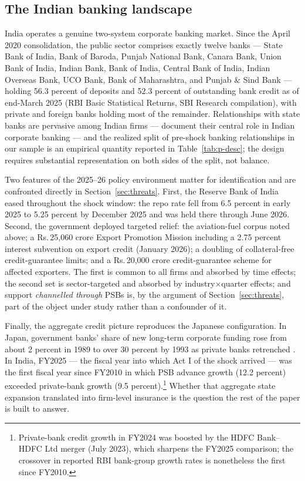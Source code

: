 \documentclass[12pt]{article}
\newcommand{\rupee}{Rs.\,}
\begin{document}
\subsection{The Indian banking landscape}\label{sec:banking}

India operates a genuine two-system corporate banking market. Since the April 2020
consolidation, the public sector comprises exactly twelve banks --- State Bank of India,
Bank of Baroda, Punjab National Bank, Canara Bank, Union Bank of India, Indian Bank, Bank
of India, Central Bank of India, Indian Overseas Bank, UCO Bank, Bank of Maharashtra, and
Punjab \& Sind Bank --- holding 56.3 percent of deposits and 52.3 percent of outstanding
bank credit as of end-March 2025 (RBI Basic Statistical Returns, SBI Research compilation),
with private and foreign banks holding most of the remainder. Relationships with state banks are
pervasive among Indian firms --- \citet{srinivasan2017} document their central role in
Indian corporate banking --- and the realized split of pre-shock banking relationships in
our sample is an empirical quantity reported in Table~\ref{tab:p-desc}; the design requires
substantial representation on both sides of the split, not balance.

Two features of the 2025--26 policy environment matter for identification and are
confronted directly in Section~\ref{sec:threats}. First, the Reserve Bank of India eased
throughout the shock window: the repo rate fell from 6.5 percent in early 2025 to 5.25
percent by December 2025 and was held there through June 2026. Second, the government
deployed targeted relief: the aviation-fuel corpus noted above; a \rupee 25{,}060 crore
Export Promotion Mission including a 2.75 percent interest subvention on export credit
(January 2026); a doubling of collateral-free credit-guarantee limits; and a
\rupee 20{,}000 crore credit-guarantee scheme for affected exporters. The first is common
to all firms and absorbed by time effects; the second set is sector-targeted and absorbed
by industry$\times$quarter effects; and support \emph{channelled through} PSBs is,
by the argument of Section~\ref{sec:threats}, part of the object under study rather than a
confounder of it.

Finally, the aggregate credit picture reproduces the Japanese configuration. In Japan,
government banks' share of new long-term corporate funding rose from about 2 percent in
1989 to over 30 percent by 1993 as private banks retrenched \citep{lin2015government}. In
India, FY2025 --- the fiscal year into which Act I of the shock arrived --- was the first
fiscal year since FY2010 in which PSB advance growth (12.2 percent) exceeded private-bank
growth (9.5 percent).\footnote{Private-bank credit growth in FY2024 was boosted by the
HDFC Bank--HDFC Ltd merger (July 2023), which sharpens the FY2025 comparison; the
crossover in reported RBI bank-group growth rates is nonetheless the first since FY2010.} Whether that aggregate state expansion translated into firm-level insurance
is the question the rest of the paper is built to answer.
\end{document}
